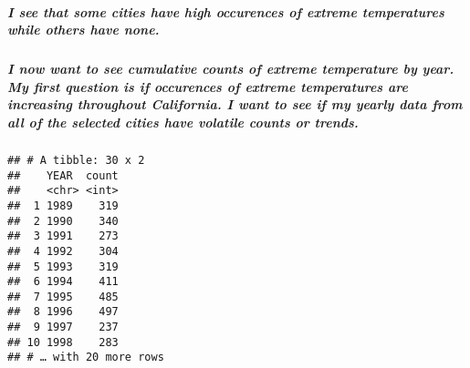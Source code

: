 \documentclass[]{article}
\newenvironment{Shaded}{\begin{snugshade}}{\end{snugshade}}
\newcommand{\DataTypeTok}[1]{\textcolor[rgb]{0.13,0.29,0.53}{#1}}
\newcommand{\DecValTok}[1]{\textcolor[rgb]{0.00,0.00,0.81}{#1}}
\newcommand{\KeywordTok}[1]{\textcolor[rgb]{0.13,0.29,0.53}{\textbf{#1}}}
\newcommand{\NormalTok}[1]{#1}
\newcommand{\OperatorTok}[1]{\textcolor[rgb]{0.81,0.36,0.00}{\textbf{#1}}}
\newcommand{\StringTok}[1]{\textcolor[rgb]{0.31,0.60,0.02}{#1}}
\let\oldsubparagraph\subparagraph
\renewcommand{\subparagraph}[1]{\oldsubparagraph{#1}\mbox{}}
\begin{document}
\hypertarget{i-see-that-some-cities-have-high-occurences-of-extreme-temperatures-while-others-have-none.}{%
\subparagraph{I see that some cities have high occurences of extreme
temperatures while others have
none.}\label{i-see-that-some-cities-have-high-occurences-of-extreme-temperatures-while-others-have-none.}}

\hypertarget{i-now-want-to-see-cumulative-counts-of-extreme-temperature-by-year.-my-first-question-is-if-occurences-of-extreme-temperatures-are-increasing-throughout-california.-i-want-to-see-if-my-yearly-data-from-all-of-the-selected-cities-have-volatile-counts-or-trends.}{%
\subparagraph{I now want to see cumulative counts of extreme temperature
by year. My first question is if occurences of extreme temperatures are
increasing throughout California. I want to see if my yearly data from
all of the selected cities have volatile counts or
trends.}\label{i-now-want-to-see-cumulative-counts-of-extreme-temperature-by-year.-my-first-question-is-if-occurences-of-extreme-temperatures-are-increasing-throughout-california.-i-want-to-see-if-my-yearly-data-from-all-of-the-selected-cities-have-volatile-counts-or-trends.}}

\begin{Shaded}
\end{Shaded}

\begin{verbatim}
## # A tibble: 30 x 2
##    YEAR  count
##    <chr> <int>
##  1 1989    319
##  2 1990    340
##  3 1991    273
##  4 1992    304
##  5 1993    319
##  6 1994    411
##  7 1995    485
##  8 1996    497
##  9 1997    237
## 10 1998    283
## # … with 20 more rows
\end{verbatim}
\end{document}
